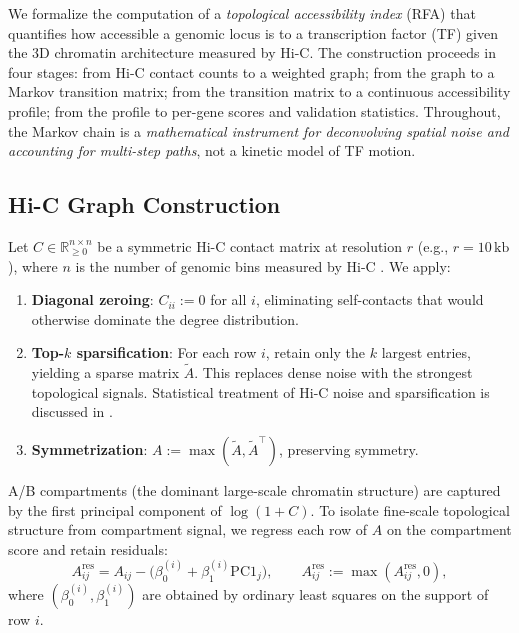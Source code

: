 \documentclass[11pt,a4paper]{article}
\begin{document}
We formalize the computation of a \emph{topological accessibility index} (RFA) that quantifies how accessible a genomic locus is to a transcription factor (TF) given the 3D chromatin architecture measured by Hi-C. The construction proceeds in four stages: from Hi-C contact counts to a weighted graph; from the graph to a Markov transition matrix; from the transition matrix to a continuous accessibility profile; from the profile to per-gene scores and validation statistics. Throughout, the Markov chain is a \emph{mathematical instrument for deconvolving spatial noise and accounting for multi-step paths}, not a kinetic model of TF motion.

\subsection{Hi-C Graph Construction}

Let $C \in \mathbb{R}_{\geq 0}^{n \times n}$ be a symmetric Hi-C contact matrix at resolution $r$ (e.g., $r = 10\,\mathrm{kb}$), where $n$ is the number of genomic bins  measured by Hi-C \cite{dekker2013,rao2014}. We apply:
\begin{enumerate}
    \item \textbf{Diagonal zeroing}: $C_{ii} := 0$ for all $i$, eliminating self-contacts that would otherwise dominate the degree distribution.
    \item \textbf{Top-$k$ sparsification}: For each row $i$, retain only the $k$ largest entries, yielding a sparse matrix $\tilde{A}$. This replaces dense noise with the strongest topological signals. Statistical treatment of Hi-C noise and sparsification is discussed
in \cite{hu2013}.
    \item \textbf{Symmetrization}: $A := \max(\tilde{A}, \tilde{A}^\top)$, preserving symmetry.
\end{enumerate}

A/B compartments (the dominant large-scale chromatin structure) are captured by the first principal component of $\log(1+C)$. To isolate fine-scale topological structure from compartment signal, we regress each row of $A$ on the compartment score and retain residuals:
\begin{equation}
A_{ij}^{\mathrm{res}} = A_{ij} - \big(\beta_0^{(i)} + \beta_1^{(i)} \mathrm{PC1}_j\big), \qquad A_{ij}^{\mathrm{res}} := \max(A_{ij}^{\mathrm{res}}, 0),
\end{equation}
where $(\beta_0^{(i)}, \beta_1^{(i)})$ are obtained by ordinary least squares on the support of row $i$.
\end{document}

